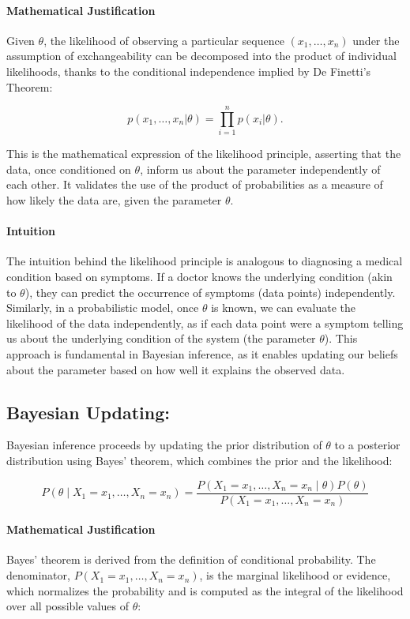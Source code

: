 \documentclass{article}
\begin{document}
\paragraph{Mathematical Justification}
Given \( \theta \), the likelihood of observing a particular sequence \( (x_1, \ldots, x_n) \) under the assumption of exchangeability can be decomposed into the product of individual likelihoods, thanks to the conditional independence implied by De Finetti's Theorem:

\[
p(x_1, \ldots, x_n | \theta) = \prod_{i=1}^{n} p(x_i | \theta).
\]

This is the mathematical expression of the likelihood principle, asserting that the data, once conditioned on \( \theta \), inform us about the parameter independently of each other. It validates the use of the product of probabilities as a measure of how likely the data are, given the parameter \( \theta \).

\paragraph{Intuition}
The intuition behind the likelihood principle is analogous to diagnosing a medical condition based on symptoms. If a doctor knows the underlying condition (akin to \( \theta \)), they can predict the occurrence of symptoms (data points) independently. Similarly, in a probabilistic model, once \( \theta \) is known, we can evaluate the likelihood of the data independently, as if each data point were a symptom telling us about the underlying condition of the system (the parameter \( \theta \)). This approach is fundamental in Bayesian inference, as it enables updating our beliefs about the parameter based on how well it explains the observed data.



\subsection{Bayesian Updating:}
Bayesian inference proceeds by updating the prior distribution of \( \theta \) to a posterior distribution using Bayes' theorem, which combines the prior and the likelihood:

\[
P(\theta \mid X_1 = x_1, \ldots, X_n = x_n) = \frac{P(X_1 = x_1, \ldots, X_n = x_n \mid \theta) P(\theta)}{P(X_1 = x_1, \ldots, X_n = x_n)}
\]

\paragraph{Mathematical Justification}
Bayes' theorem is derived from the definition of conditional probability. The denominator, \( P(X_1 = x_1, \ldots, X_n = x_n) \), is the marginal likelihood or evidence, which normalizes the probability and is computed as the integral of the likelihood over all possible values of \( \theta \):
\end{document}
